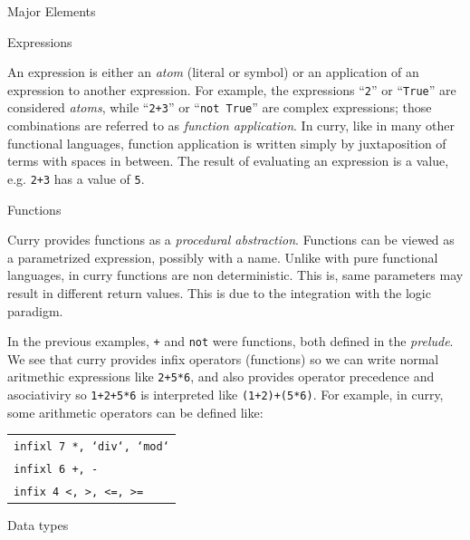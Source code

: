 \documentclass{beamer}
\newcommand{\q}[1]{\texttt{#1}}
\begin{document}
\begin{section}{Major Elements}


  \begin{subsection}{Expressions}
    \begin{frame}
      An expression is either an \textit{atom} (literal or symbol) or
      an        application
      of an expression to another expression. For example, the
      expressions
      ``\q{2}'' or ``\q{True}'' are considered \textit{atoms}, while
      ``\q{2+3}'' or ``\q{not True}'' are complex expressions; those
      combinations are referred to as \textit{function application}.
      In curry,        like in
      many other functional languages, function application is written
      simply        by
      juxtaposition of terms with spaces in between. The result of
      evaluating        an
      expression is a value, e.g. \q{2+3} has a value of \q{5}.
    \end{frame}
  \end{subsection}


  \begin{subsection}{Functions}
    \begin{frame}
      Curry provides functions as a \textit{procedural abstraction}.
      Functions can be viewed as a parametrized expression, possibly
      with a name.
      Unlike with pure functional languages, in curry functions are
      non deterministic. This is, same parameters may result in different
      return        values.
      This is due to the integration with the logic paradigm.
    \end{frame}
    \begin{frame}
      In the previous examples, \q{+} and \q{not} were
      functions, both        defined        in
      the \textit{prelude}. We see that curry provides infix
      operators                (functions) so
      we can write normal aritmethic expressions like
      \q{2+5*6}, and        also        provides
      operator precedence and asociativiry so \q{1+2+5*6} is
      interpreted like
      \q{(1+2)+(5*6)}. For example, in curry, some arithmetic
      operators can be
      defined like:\\
      \begin{tabular}[c]{l}
        \\
        \q{infixl 7 *, ‘div‘, ‘mod‘}\\
        \q{infixl 6 +, -}\\
        \q{infix 4 <, >, <=, >=}
      \end{tabular}
    \end{frame}
  \end{subsection}
  \begin{subsection}{Data types}
    

\end{subsection}
\end{section}
\end{document}
